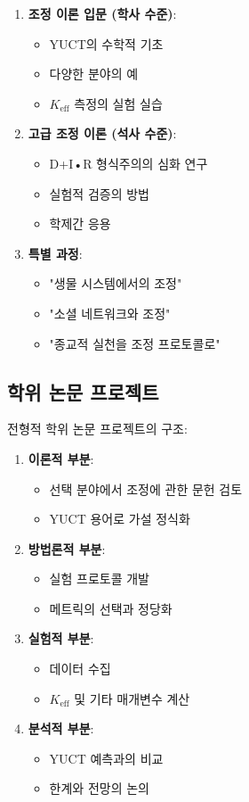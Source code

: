\documentclass[12pt,a4paper]{article}
\begin{document}
	\begin{enumerate}
		\item \textbf{조정 이론 입문 (학사 수준)}:
		\begin{itemize}
			\item YUCT의 수학적 기초
			\item 다양한 분야의 예
			\item \(K_{\mathrm{eff}}\) 측정의 실험 실습
		\end{itemize}
		
		\item \textbf{고급 조정 이론 (석사 수준)}:
		\begin{itemize}
			\item D+I•R 형식주의의 심화 연구
			\item 실험적 검증의 방법
			\item 학제간 응용
		\end{itemize}
		
		\item \textbf{특별 과정}:
		\begin{itemize}
			\item "생물 시스템에서의 조정"
			\item "소셜 네트워크와 조정"
			\item "종교적 실천을 조정 프로토콜로"
		\end{itemize}
	\end{enumerate}
	
	\subsection{학위 논문 프로젝트}
	
	전형적 학위 논문 프로젝트의 구조:
	\begin{enumerate}
		\item \textbf{이론적 부분}:
		\begin{itemize}
			\item 선택 분야에서 조정에 관한 문헌 검토
			\item YUCT 용어로 가설 정식화
		\end{itemize}
		
		\item \textbf{방법론적 부분}:
		\begin{itemize}
			\item 실험 프로토콜 개발
			\item 메트릭의 선택과 정당화
		\end{itemize}
		
		\item \textbf{실험적 부분}:
		\begin{itemize}
			\item 데이터 수집
			\item \(K_{\mathrm{eff}}\) 및 기타 매개변수 계산
		\end{itemize}
		
		\item \textbf{분석적 부분}:
		\begin{itemize}
			\item YUCT 예측과의 비교
			\item 한계와 전망의 논의
		\end{itemize}
	\end{enumerate}
	
\end{document}
